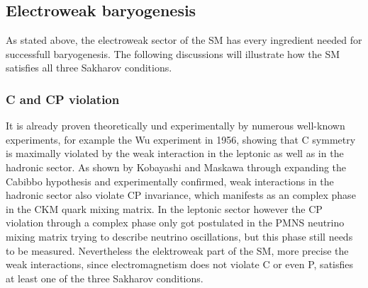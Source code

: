 \subsection{Electroweak baryogenesis}
As stated above, the electroweak sector of the SM has every ingredient needed for successfull baryogenesis. The following discussions will illustrate how the SM satisfies all three Sakharov conditions.
\subsubsection{C and CP violation}
It is already proven theoretically und experimentally by numerous well-known experiments, for example the Wu experiment in 1956, showing that C symmetry is maximally violated by the weak interaction in the leptonic as well as in the hadronic sector. As shown by Kobayashi and Maskawa through expanding the Cabibbo hypothesis and experimentally confirmed, weak interactions in the hadronic sector also violate CP invariance, which manifests as an complex phase in the CKM quark mixing matrix. In the leptonic sector however the CP violation through a complex phase only got postulated in the PMNS neutrino mixing matrix trying to describe neutrino oscillations, but this phase still needs to be measured.\newline
Nevertheless the elektroweak part of the SM, more precise the weak interactions, since electromagnetism does not violate C or even P, satisfies at least one of the three Sakharov conditions.\newline
